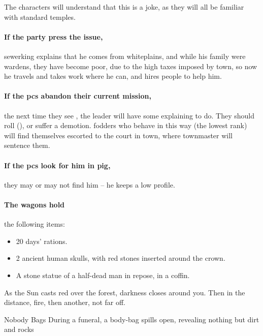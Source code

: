 The characters will understand that this is a joke, as they will all be familiar with standard temples.

\paragraph{If the party press the issue,}
\gls{sewerking} explains that he comes from \gls{whiteplains}, and while his family were \glspl{warden}, they have become poor, due to the high taxes imposed by \gls{town}, so now he travels and takes work where he can, and hires people to help him.

\paragraph{If the \glspl{pc} abandon their current mission,}
the next time they see , the leader will have some explaining to do.
They should roll  (\tn[12]), or suffer a demotion.
\Glspl{fodder} who behave in this way (the lowest rank) will find themselves escorted to the \gls{court} in \gls{town}, where \gls{townmaster} will sentence them.

\paragraph{If the \glspl{pc} look for him in \gls{pig},}
they may or may not find him -- he keeps a low profile.

\paragraph{The wagons hold}
the following items:

\null
\begin{itemize}
  \item
  20 days' rations.
  \item
  2 ancient human skulls, with red stones inserted around the crown.
  \label{skullCrown}
  \item
  A stone statue of a half-dead man in repose, in a coffin.
\end{itemize}

\begin{boxtext}
  As the Sun casts red over the forest, darkness closes around you.
  Then in the distance, fire, then another, not far off.
\end{boxtext}

  {Nobody Bags}%
  {During a funeral, a body-bag spills open, revealing nothing but dirt and rocks}%

